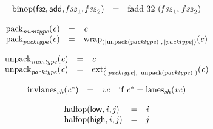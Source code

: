 $$
\begin{array}{@{}lcl@{}l@{}}
{\mathrm{binop}}(\mathsf{f{\scriptstyle32}}, \mathsf{add}, {\mathit{f{\scriptstyle32}}}_{{1}}, {\mathit{f{\scriptstyle32}}}_{{2}}) &=& {\mathrm{fadd}}~32~({\mathit{f{\scriptstyle32}}}_{{1}},\, {\mathit{f{\scriptstyle32}}}_{{2}}) &  \\
\end{array}
$$

\vspace{1ex}

$$
\begin{array}{@{}lcl@{}l@{}}
{{\mathrm{pack}}}_{{\mathit{numtype}}}({\mathit{c}}) &=& {\mathit{c}} &  \\
{{\mathrm{pack}}}_{{\mathit{packtype}}}({\mathit{c}}) &=& {{{\mathrm{wrap}}}_{({|{\mathrm{unpack}}({\mathit{packtype}})|},\, {|{\mathit{packtype}}|})}}{({\mathit{c}})} &  \\
\end{array}
$$

$$
\begin{array}{@{}lcl@{}l@{}}
{{\mathrm{unpack}}}_{{\mathit{numtype}}}({\mathit{c}}) &=& {\mathit{c}} &  \\
{{\mathrm{unpack}}}_{{\mathit{packtype}}}({\mathit{c}}) &=& {{{{\mathrm{ext}}}_{({|{\mathit{packtype}}|},\, {|{\mathrm{unpack}}({\mathit{packtype}})|})}^{\mathsf{u}}}}{({\mathit{c}})} &  \\
\end{array}
$$

\vspace{1ex}

$$
\begin{array}{@{}lcl@{}l@{}}
{{\mathrm{invlanes}}}_{{\mathit{sh}}}({{\mathit{c}}^\ast}) &=& {\mathit{vc}} &\quad
  \mbox{if}~{{\mathit{c}}^\ast} = {{\mathrm{lanes}}}_{{\mathit{sh}}}({\mathit{vc}}) \\
\end{array}
$$

$$
\begin{array}{@{}lcl@{}l@{}}
{\mathrm{halfop}}(\mathsf{low}, {\mathit{i}}, {\mathit{j}}) &=& {\mathit{i}} &  \\
{\mathrm{halfop}}(\mathsf{high}, {\mathit{i}}, {\mathit{j}}) &=& {\mathit{j}} &  \\
\end{array}
$$

